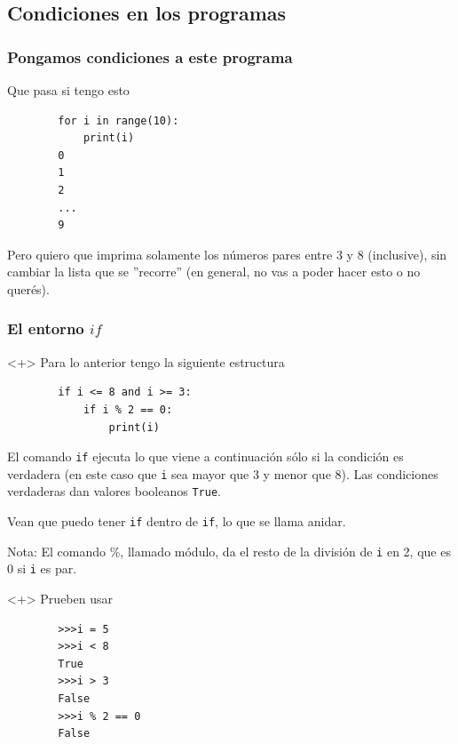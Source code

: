 \documentclass{beamer}
\begin{document}
\subsection{Condiciones en los programas}

\begin{frame}[fragile]
    \frametitle{Pongamos condiciones a este programa}
    Que pasa si tengo esto
    \begin{verbatim}
        for i in range(10):
            print(i)
        0
        1
        2
        ...
        9
    \end{verbatim}
    Pero quiero que imprima solamente los números pares entre 3 y 8 (inclusive), sin cambiar la lista que se ''recorre'' \footnotesize{(en general, no vas a poder hacer esto o no querés)}.
\end{frame}

\begin{frame}[fragile]
    \frametitle{El entorno $if$}
    \begin{onlyenv}<+>
    Para lo anterior tengo la siguiente estructura
    \begin{verbatim}
        if i <= 8 and i >= 3:
            if i % 2 == 0:
                print(i)
    \end{verbatim}
    El comando \texttt{if} ejecuta lo que viene a continuación sólo si la condición es verdadera (en este caso que \texttt{i} sea mayor que 3 y menor que 8). Las condiciones verdaderas dan valores booleanos \texttt{True}. 
    
    Vean que puedo tener \texttt{if} dentro de \texttt{if}, lo que se llama anidar. 
    
    \vspace{5mm}
    \tiny{Nota: El comando \%, llamado módulo, da el resto de la división de \texttt{i} en 2, que es 0 si \texttt{i} es par.}
    \end{onlyenv}
    
    
    \begin{onlyenv}<+>
        Prueben usar
        \begin{verbatim}
        >>>i = 5
        >>>i < 8
        True
        >>>i > 3
        False
        >>>i % 2 == 0
        False
        \end{verbatim}
    \end{onlyenv}
\end{frame}
\end{document}
